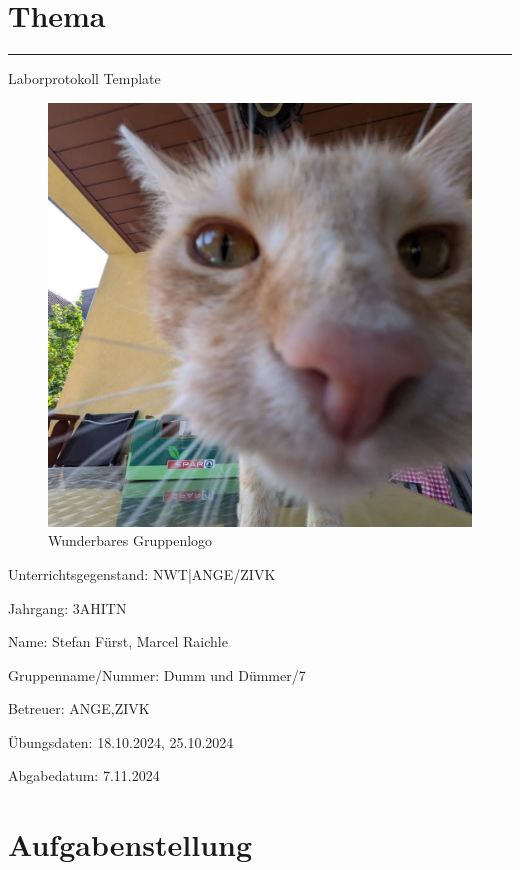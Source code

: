 \documentclass[a4paper]{article}
\begin{document}

\pagestyle{oida}
\section*{Thema}
\par\noindent\rule{\textwidth}{0.4pt}

Laborprotokoll
Template

\begin{figure}[h]
	\includegraphics[scale=0.3]{images/mika.jpeg}
	\caption{Wunderbares Gruppenlogo}
\end{figure}

\vspace*{\fill}
Unterrichtsgegenstand:	NWT|ANGE/ZIVK

Jahrgang:	3AHITN

Name:	Stefan Fürst, Marcel Raichle

Gruppenname/Nummer: Dumm und Dümmer/7

Betreuer: 	ANGE,ZIVK

Übungsdaten:	18.10.2024, 25.10.2024

Abgabedatum:	7.11.2024


\newpage
\tableofcontents

\newpage

\section{Aufgabenstellung}
\end{document}
